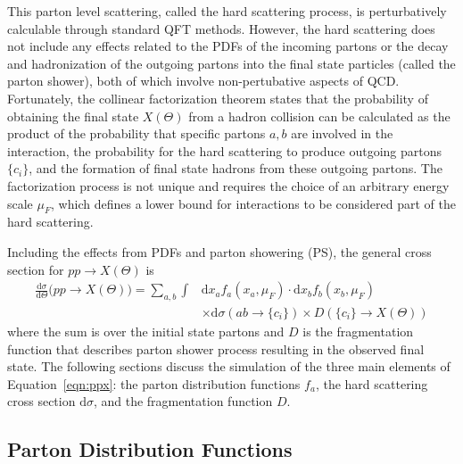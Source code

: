 This parton level scattering, called the hard scattering process, is perturbatively calculable through standard QFT methods.
However, the hard scattering does not include any effects related to the PDFs of the incoming partons or the decay and hadronization of the outgoing partons into the final state particles (called the parton shower), both of which involve non-pertubative aspects of QCD.
Fortunately, the collinear factorization theorem states that the probability of obtaining the final state $X(\Theta)$ from a hadron collision can be calculated as the product of the probability that specific partons $a,b$ are involved in the interaction, the probability for the hard scattering to produce outgoing partons $\{c_i\}$, and the formation of final state hadrons from these outgoing partons.
The factorization process is not unique and requires the choice of an arbitrary energy scale $\mu_F$, which defines a lower bound for interactions to be considered part of the hard scattering.  

Including the effects from PDFs and parton showering (PS), the general cross section for $pp \rightarrow X(\Theta)$ is
\begin{align}
  \label{eqn:ppx}
  \frac{\text{d}\sigma}{\text{d}\Theta} \Big(pp \rightarrow X(\Theta) \Big) =
  \sum_{a,b} \int & \text{d} x_a f_a(x_a, \mu_F) \cdot \text{d} x_b f_b(x_b, \mu_F)  \nonumber \\
  & \times \text{d}\sigma \left(ab \rightarrow \{c_i\} \right)
  \times D \left( \{c_i\} \rightarrow X(\Theta) \right) 
\end{align}
where the sum is over the initial state partons and $D$ is the fragmentation function that describes parton shower process resulting in the observed final state.
The following sections discuss the simulation of the three main elements of Equation~\ref{eqn:ppx}: the parton distribution functions $f_a$, the hard scattering cross section $\text{d}\sigma$, and the fragmentation function $D$.

\subsection{Parton Distribution Functions}

